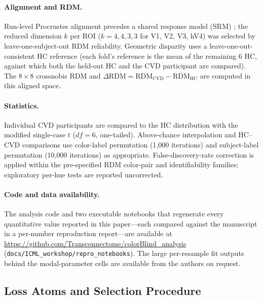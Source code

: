 \documentclass{article}
\begin{document}
\paragraph{Alignment and RDM.}
Run-level Procrustes alignment precedes a shared response model (SRM) \citep{chen2015}; the reduced dimension $k$ per ROI ($k = 4, 4, 3, 3$ for V1, V2, V3, hV4) was selected by leave-one-subject-out RDM reliability.
Geometric disparity uses a leave-one-out-consistent HC reference (each fold's reference is the mean of the remaining 6 HC, against which both the held-out HC and the CVD participant are compared).
The $8\times 8$ crossnobis RDM \citep{walther2016} and $\Delta\text{RDM} = \text{RDM}_{\text{CVD}} - \overline{\text{RDM}}_{\text{HC}}$ are computed in this aligned space.

\paragraph{Statistics.}
Individual CVD participants are compared to the HC distribution with the \citet{crawford1998} modified single-case $t$ ($df = 6$, one-tailed). Above-chance interpolation and HC--CVD comparisons use color-label permutation (1{,}000 iterations) and subject-label permutation (10{,}000 iterations) as appropriate. False-discovery-rate correction is applied within the pre-specified RDM color-pair and identifiability families; exploratory per-hue tests are reported uncorrected.

\paragraph{Code and data availability.}
The analysis code and two executable notebooks that regenerate every quantitative value reported in this paper---each compared against the manuscript in a per-number reproduction report---are available at \url{https://github.com/Transconnectome/colorBlind_analysis} (\texttt{docs/ICML\_workshop/repro\_notebooks}). The large per-resample fit outputs behind the modal-parameter cells are available from the authors on request.

\subsection{Loss Atoms and Selection Procedure}
\label{app:selection}
\end{document}
